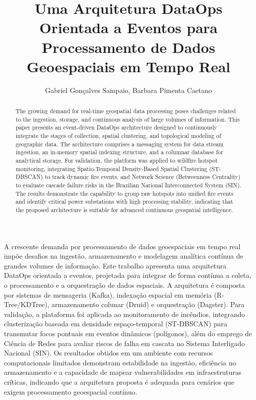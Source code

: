 \documentclass[12pt]{article}
\title{Uma Arquitetura DataOps Orientada a Eventos para Processamento de Dados Geoespaciais em Tempo Real}
\author{Gabriel Gonçalves Sampaio\inst{1}, Barbara Pimenta Caetano\inst{1}}
\begin{document}
\maketitle

\begin{abstract}
  The growing demand for real-time geospatial data processing poses challenges related to the ingestion, storage, and continuous analysis of large volumes of information. This paper presents an event-driven DataOps architecture designed to continuously integrate the stages of collection, spatial clustering, and topological modeling of geographic data. The architecture comprises a messaging system for data stream ingestion, an in-memory spatial indexing structure, and a columnar database for analytical storage. For validation, the platform was applied to wildfire hotspot monitoring, integrating Spatio-Temporal Density-Based Spatial Clustering (ST-DBSCAN) to track dynamic fire events, and Network Science (Betweenness Centrality) to evaluate cascade failure risks in the Brazilian National Interconnected System (SIN). The results demonstrate the capability to group raw hotspots into unified fire events and identify critical power substations with high processing stability, indicating that the proposed architecture is suitable for advanced continuous geospatial intelligence.
\end{abstract}

\begin{resumo}
  A crescente demanda por processamento de dados geoespaciais em tempo real impõe desafios na ingestão, armazenamento e modelagem analítica contínua de grandes volumes de informação. Este trabalho apresenta uma arquitetura DataOps orientada a eventos, projetada para integrar de forma contínua a coleta, o processamento e a orquestração de dados espaciais. A arquitetura é composta por sistemas de mensageria (Kafka), indexação espacial em memória (R-Tree/KDTree), armazenamento colunar (Druid) e orquestração (Dagster). Para validação, a plataforma foi aplicada ao monitoramento de incêndios, integrando clusterização baseada em densidade espaço-temporal (ST-DBSCAN) para transmutar focos pontuais em eventos dinâmicos (polígonos), além do emprego de Ciência de Redes para avaliar riscos de falha em cascata no Sistema Interligado Nacional (SIN). Os resultados obtidos em um ambiente com recursos computacionais limitados demonstram estabilidade na ingestão, eficiência no armazenamento e a capacidade de mapear vulnerabilidades em infraestruturas críticas, indicando que a arquitetura proposta é adequada para cenários que exigem processamento geoespacial contínuo.
\end{resumo}
\end{document}
